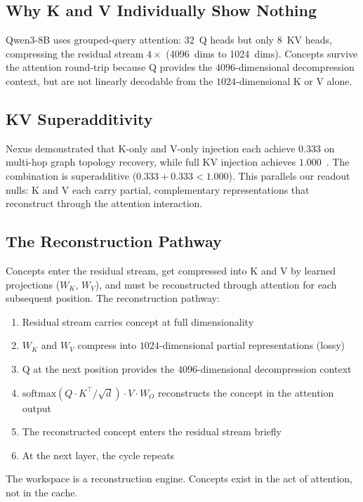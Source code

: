 \documentclass[11pt,a4paper]{article}
\begin{document}
\subsection{Why K and V Individually Show Nothing}

Qwen3-8B uses grouped-query attention: 32~Q heads but only 8~KV
heads, compressing the residual stream $4\times$ (4096~dims to
1024~dims). Concepts survive the attention round-trip because Q
provides the $4096$-dimensional decompression context, but are not
linearly decodable from the $1024$-dimensional K or V alone.

\subsection{KV Superadditivity}

Nexus demonstrated that K-only and V-only injection each achieve
$0.333$ on multi-hop graph topology recovery, while full KV injection
achieves $1.000$~\citep{lyra2026nexus_kv}. The combination is
superadditive ($0.333 + 0.333 < 1.000$). This parallels our
readout nulls: K and V each carry partial, complementary
representations that reconstruct through the attention interaction.

\subsection{The Reconstruction Pathway}

Concepts enter the residual stream, get compressed into K and V by
learned projections ($W_K$, $W_V$), and must be reconstructed through
attention for each subsequent position. The reconstruction pathway:
\begin{enumerate}[nosep]
\item Residual stream carries concept at full dimensionality
\item $W_K$ and $W_V$ compress into $1024$-dimensional partial
  representations (lossy)
\item Q at the next position provides the $4096$-dimensional
  decompression context
\item $\text{softmax}(Q \cdot K^\top / \sqrt{d}) \cdot V \cdot W_O$
  reconstructs the concept in the attention output
\item The reconstructed concept enters the residual stream briefly
\item At the next layer, the cycle repeats
\end{enumerate}

The workspace is a reconstruction engine. Concepts exist in the act
of attention, not in the cache.
\end{document}
